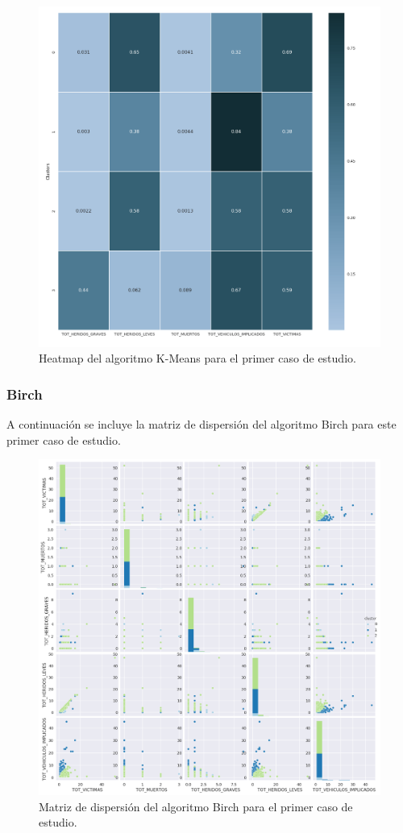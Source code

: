 	\begin{figure}[H]
		\centering
		\includegraphics[scale=0.4]{heatmaps/K-Means-HighwayAccidents-Heatmap.png}
		\caption{Heatmap del algoritmo K-Means para el primer caso de estudio.}
	\end{figure}

	\subsubsection{Birch}
	A continuación se incluye la matriz de dispersión del algoritmo Birch para este primer caso de estudio.
	
	\begin{figure}[H]
		\centering
		\includegraphics[scale=0.5]{plots/Birch-HighwayAccidents-ScatterMatrix.png}
		\caption{Matriz de dispersión del algoritmo Birch para el primer caso de estudio.}
	\end{figure}


